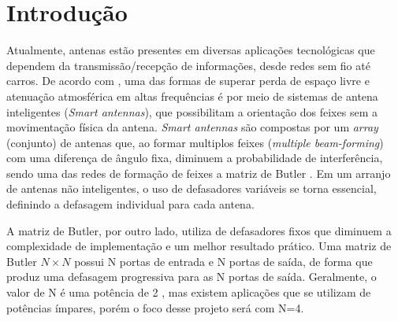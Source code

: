 \documentclass[
	12pt,				%
	oneside,			%
	a4paper,			%
	english,			%
	french,				%
	spanish,			%
	brazil,				%
	]{abntex2}
\begin{document}

\tableofcontents*
\cleardoublepage


\textual

\chapter[Introdução]{Introdução}

Atualmente, antenas estão presentes em diversas aplicações tecnológicas que dependem da transmissão/recepção de informações, desde redes sem fio até carros\cite{jose2025butler,sakhiya2023low}. De acordo com , uma das formas de superar perda de espaço livre e atenuação atmosférica em altas frequências é por meio de sistemas de antena inteligentes (\textit{Smart antennas}), que possibilitam a orientação dos feixes sem a movimentação física da antena. \textit{Smart antennas} são compostas por um \textit{array} (conjunto) de antenas que, ao formar multiplos feixes (\textit{multiple beam-forming}) com uma diferença de ângulo fixa, diminuem a probabilidade de interferência, sendo uma das redes de formação de feixes a matriz de Butler \cite{augusto2016butler, bhowmik2017modelling}. Em um arranjo de antenas não inteligentes, o uso de defasadores variáveis se torna essencial, definindo a defasagem individual para cada antena.


A matriz de Butler, por outro lado, utiliza de defasadores fixos que diminuem a complexidade de implementação e um melhor resultado prático. Uma matriz de Butler \(N \times N\) possui N portas de entrada e N portas de saída, de forma que produz uma defasagem progressiva para as N portas de saída. Geralmente, o valor de N é uma potência de 2 \cite{bhowmik2017modelling}, mas existem aplicações que se utilizam de potências ímpares, porém o foco desse projeto será com N=4. 
\end{document}
